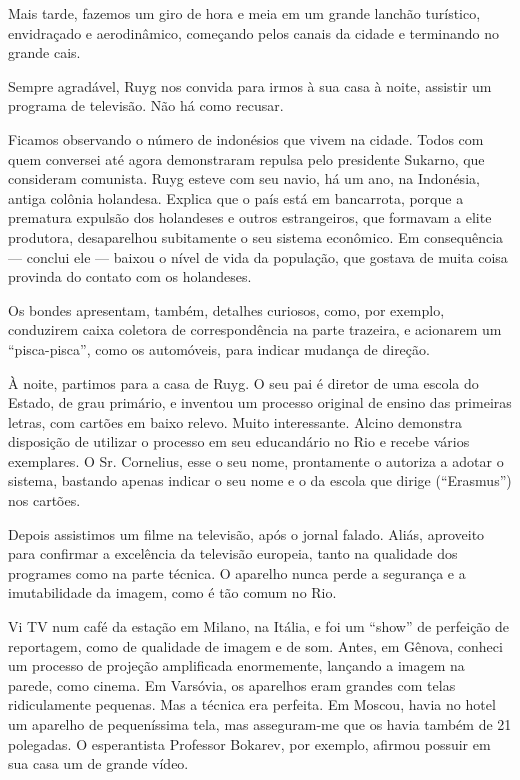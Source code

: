 Mais tarde, fazemos um giro de hora e meia em um grande lanchão turístico, envidraçado e aerodinâmico, começando pelos canais da cidade e terminando no grande cais.

Sempre agradável, Ruyg nos convida para irmos à sua casa à noite, assistir um programa de televisão. Não há como recusar.

Ficamos observando o número de indonésios que vivem na cidade. Todos com quem conversei até agora demonstraram repulsa pelo presidente Sukarno, que consideram comunista. Ruyg esteve com seu navio, há um ano, na Indonésia, antiga colônia holandesa. Explica que o país está em bancarrota, porque a prematura expulsão dos holandeses e outros estrangeiros, que formavam a elite produtora, desaparelhou subitamente o seu sistema econômico. Em consequência --- conclui ele --- baixou o nível de vida da população, que gostava de muita coisa provinda do contato com os holandeses.

Os bondes apresentam, também, detalhes curiosos, como, por exemplo, conduzirem caixa coletora de correspondência na parte trazeira, e acionarem um ``pisca-pisca'', como os automóveis, para indicar mudança de direção.

À noite, partimos para a casa de Ruyg. O seu pai é diretor de uma escola do Estado, de grau primário, e inventou um processo original de ensino das primeiras letras, com cartões em baixo relevo. Muito interessante. Alcino demonstra disposição de utilizar o processo em seu educandário no Rio e recebe vários exemplares. O Sr. Cornelius, esse o seu nome, prontamente o autoriza a adotar o sistema, bastando apenas indicar o seu nome e o da escola que dirige (``Erasmus'') nos cartões.

Depois assistimos um filme na televisão, após o jornal falado. Aliás, aproveito para confirmar a excelência da televisão europeia, tanto na qualidade dos programes como na parte técnica. O aparelho nunca perde a segurança e a imutabilidade da imagem, como é tão comum no Rio.

Vi TV num café da estação em Milano, na Itália, e foi um ``show'' de perfeição de reportagem, como de qualidade de imagem e de som. Antes, em Gênova, conheci um processo de projeção amplificada enormemente, lançando a imagem na parede, como cinema. Em Varsóvia, os aparelhos eram grandes com telas ridiculamente pequenas. Mas a técnica era perfeita. Em Moscou, havia no hotel um aparelho de pequeníssima tela, mas asseguram-me que os havia também de 21 polegadas. O esperantista Professor Bokarev, por exemplo, afirmou possuir em sua casa um de grande vídeo.

